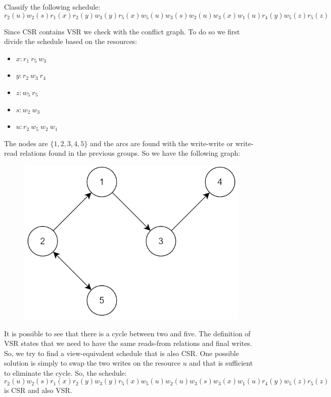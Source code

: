 \documentclass[12pt, a4paper]{report}
\newtheorem[style=M,bodystyle=\normalfont]{theorem}{Theorem}
\newtheorem[style=M,bodystyle=\normalfont]{corollary}{Corollary}
\newtheorem[style=M,bodystyle=\normalfont]{lemma}{Lemma}
\newtheorem[style=M,bodystyle=\normalfont]{definition}{Definition}
\begin{document}
    \begin{Exercise}[label=4]
        Classify the following schedule: 
        \[r_2(u) w_2(s) r_1(x) r_2(y) w_3(y) r_5(x) w_5(u) w_3(s)w_2(u) w_3(x) w_1(u) r_4(y) w_5(z) r_5(z)\]
    \end{Exercise}
    \begin{Answer}[ref=4]
        Since CSR contains VSR we check with the conflict graph. To do so we first divide the schedule based on the resources: 
        \begin{itemize}
            \item $x: r_1 \: r_5 \:w_3$
            \item $y: r_2 \: w_3 \:r_4$
            \item $z: w_5 \: r_5$
            \item $s: w_2 \: w_3$
            \item $u: r_2 \: w_5 \: w_2 \:w_1$
        \end{itemize}
        The nodes are $\{1,2,3,4,5\}$ and the arcs are found with the write-write or write-read relations found in the previous groups. So we have the following graph:
        \begin{figure}[H]
            \centering
            \includegraphics[width=0.5\linewidth]{images/conflictgraph1.png}
        \end{figure}
        It is possible to see that there is a cycle between two and five. The definition of VSR states that we need to have the same reads-from relations and final writes. So, we try to find a view-equivalent 
        schedule that is also CSR. One possible solution is simply to swap the two writes on the resource $u$ and that is sufficient to eliminate the cycle. So, the schedule: 
        \[r_2(u) w_2(s) r_1(x) r_2(y) w_3(y) r_5(x) w_5(u) w_2(u) w_3(s) w_3(x) w_1(u) r_4(y) w_5(z) r_5(z)\]
        is CSR and also VSR. 
    \end{Answer}

    \newpage
    
\end{document}
